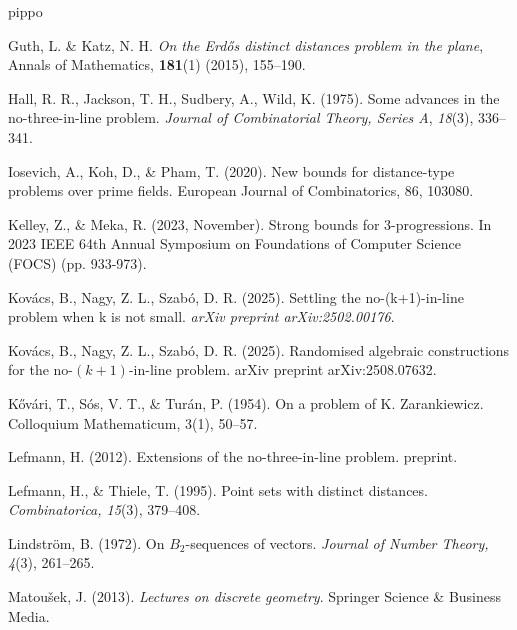 \documentclass[11pt]{article}
\theoremstyle{plain}
\begin{document}
\begin{thebibliography}{pippo}
		
		Guth, L. \&  Katz, N. H.
		\textit{On the Erd\H{o}s distinct distances problem in the plane}, 
		Annals of Mathematics, \textbf{181}(1) (2015), 155--190.
		
		
		
		Hall, R. R., Jackson, T. H., Sudbery, A.,    Wild, K. (1975). Some advances in the no-three-in-line problem. {\em Journal of Combinatorial Theory, Series A}, {\em 18}(3), 336--341.
		
		 Iosevich, A., Koh, D., \& Pham, T. (2020). New bounds for distance-type problems over prime fields. European Journal of Combinatorics, 86, 103080.
		
		 Kelley, Z., \& Meka, R. (2023, November). Strong bounds for 3-progressions. In 2023 IEEE 64th Annual Symposium on Foundations of Computer Science (FOCS) (pp. 933-973). 
		
		Kov{á}cs, B., Nagy, Z. L.,    Szab{ó}, D. R. (2025). Settling the no-(k+1)-in-line problem when k is not small. {\em arXiv preprint arXiv:2502.00176}.
		
		
		 Kovács, B., Nagy, Z. L.,  Szabó, D. R. (2025). Randomised algebraic constructions for the no-$(k+ 1) $-in-line problem. arXiv preprint arXiv:2508.07632.
		
		Kővári, T., Sós, V. T., \& Turán, P. (1954). On a problem of K. Zarankiewicz. Colloquium Mathematicum, 3(1), 50–57.
		
		 Lefmann, H. (2012). Extensions of the no-three-in-line problem. preprint.
		
		 Lefmann, H., \& Thiele, T. (1995). Point sets with distinct distances. \textit{Combinatorica, 15}(3), 379–408. %
		
		 Lindström, B. (1972). On $B_2$-sequences of vectors. \textit{Journal of Number Theory, 4}(3), 261–265. %
		
		
		 Matoušek, J. (2013). \textit{Lectures on discrete geometry}. Springer Science \& Business Media.
		

\end{thebibliography}
\end{document}
